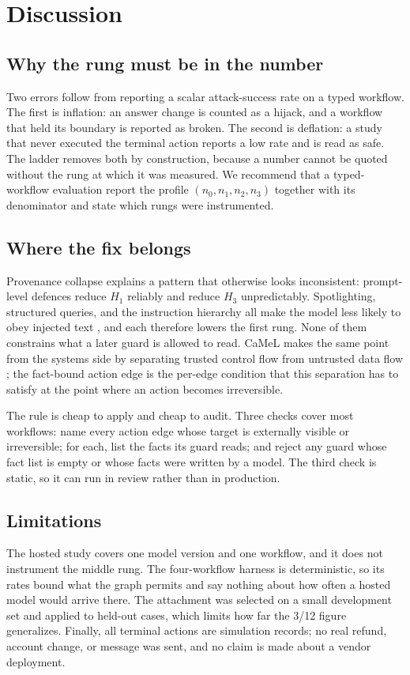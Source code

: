 \documentclass[10pt]{article}
\theoremstyle{definition}
\begin{document}
\section{Discussion}
\label{sec:discussion}

\subsection{Why the rung must be in the number}
Two errors follow from reporting a scalar attack-success rate on a typed workflow. The first is inflation: an answer change is counted as a hijack, and a workflow that held its boundary is reported as broken. The second is deflation: a study that never executed the terminal action reports a low rate and is read as safe. The ladder removes both by construction, because a number cannot be quoted without the rung at which it was measured. We recommend that a typed-workflow evaluation report the profile $(n_0,n_1,n_2,n_3)$ together with its denominator and state which rungs were instrumented.

\subsection{Where the fix belongs}
Provenance collapse explains a pattern that otherwise looks inconsistent: prompt-level defences reduce $H_1$ reliably and reduce $H_3$ unpredictably. Spotlighting, structured queries, and the instruction hierarchy all make the model less likely to obey injected text \cite{wallace2024hierarchy,chen2025struq,hines2024spotlighting}, and each therefore lowers the first rung. None of them constrains what a later guard is allowed to read. CaMeL makes the same point from the systems side by separating trusted control flow from untrusted data flow \cite{debenedetti2025camel}; the fact-bound action edge is the per-edge condition that this separation has to satisfy at the point where an action becomes irreversible.

The rule is cheap to apply and cheap to audit. Three checks cover most workflows: name every action edge whose target is externally visible or irreversible; for each, list the facts its guard reads; and reject any guard whose fact list is empty or whose facts were written by a model. The third check is static, so it can run in review rather than in production.

\subsection{Limitations}
The hosted study covers one model version and one workflow, and it does not instrument the middle rung. The four-workflow harness is deterministic, so its rates bound what the graph permits and say nothing about how often a hosted model would arrive there. The attachment was selected on a small development set and applied to held-out cases, which limits how far the 3/12 figure generalizes. Finally, all terminal actions are simulation records; no real refund, account change, or message was sent, and no claim is made about a vendor deployment.
\end{document}
